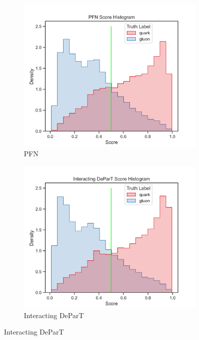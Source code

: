 \begin{figure}[!htb]
\begin{subfigure}[t]{0.49\textwidth}
	\end{subfigure}
	\begin{subfigure}[t]{0.49\textwidth}
		\includegraphics[width=1\textwidth]{src/plots/results/score/pfn.png}
		\caption{PFN}
		\label{fig:app_score_pfn}
	\end{subfigure}
	\begin{subfigure}[t]{0.49\textwidth}
		\includegraphics[width=1\textwidth]{src/plots/results/score/interacting_depart.png}
		\caption{Interacting DeParT}
		\label{fig:app_score_interacting_depart}
	\end{subfigure}

\end{figure}
